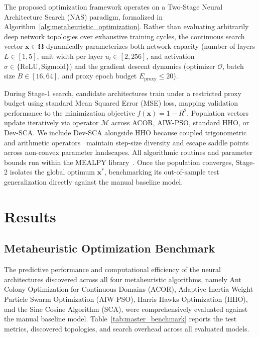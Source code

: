 \documentclass[runningheads]{llncs}
\begin{document}
The proposed optimization framework operates on a Two-Stage Neural Architecture Search (NAS)
paradigm, formalized in Algorithm~\ref{alg:metaheuristic_optimization}. Rather than evaluating
arbitrarily deep network topologies over exhaustive training cycles, the continuous search vector
$\mathbf{x} \in \mathbf{\Omega}$ dynamically parameterizes both network capacity (number of layers
	$L \in [1, 5]$, unit width per layer $u_l \in [2, 256]$, and activation $\sigma \in \{\text{ReLU},
\text{Sigmoid}\}$) and the gradient descent dynamics (optimizer $\mathcal{O}$, batch size $B \in
[16, 64]$, and proxy epoch budget $E_{\text{proxy}} \le 20$).

During Stage-1 search, candidate architectures train under a restricted proxy budget using standard
Mean Squared Error (MSE) loss, mapping validation performance to the minimization objective
$f(\mathbf{x}) = 1 - R^2$. Population vectors update iteratively via operator $\mathcal{M}$ across
ACOR, AIW-PSO, standard HHO, or Dev-SCA. We include Dev-SCA alongside HHO because coupled
trigonometric and arithmetic operators~\cite{abdulrab2023hybrid, devan2023novel, abdulrab2024energy}
maintain step-size diversity and escape saddle points across non-convex parameter landscapes.
All algorithmic routines and parameter bounds run within the MEALPY
library~\cite{van2023mealpy,van2023groundwater,ahmed2021comprehensive}. Once the population
converges, Stage-2 isolates the global optimum $\mathbf{x}^*$, benchmarking its out-of-sample
test generalization directly against the manual baseline model.

\section{Results}

\subsection{Metaheuristic Optimization Benchmark}

The predictive performance and computational efficiency of the neural architectures discovered
across all four metaheuristic algorithms, namely Ant Colony Optimization for Continuous Domains (ACOR),
Adaptive Inertia Weight Particle Swarm Optimization (AIW-PSO), Harris Hawks Optimization (HHO), and
the Sine Cosine Algorithm (SCA), were comprehensively evaluated against the manual baseline model.
Table~\ref{tab:master_benchmark} reports the test metrics, discovered topologies, and search
overhead across all evaluated models.
\end{document}
